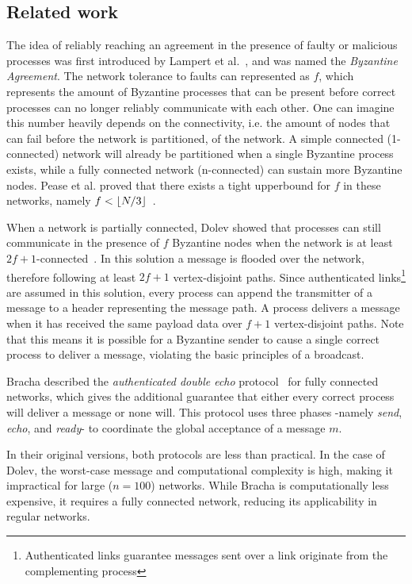 \subsection*{Related work}
The idea of reliably reaching an agreement in the presence of faulty or malicious processes was first introduced by Lampert et al.~\cite{lamport2019byzantine}, and was named the \textit{Byzantine Agreement}. The network tolerance to faults can represented as $f$, which represents the amount of Byzantine processes that can be present before correct processes can no longer reliably communicate with each other. One can imagine this number heavily depends on the connectivity, i.e. the amount of nodes that can fail before the network is partitioned, of the network. A simple connected (1-connected) network will already be partitioned when a single Byzantine process exists, while a fully connected network (n-connected) can sustain more Byzantine nodes. Pease et al. proved that there exists a tight upperbound for $f$ in these networks, namely $f < \lfloor N/3\rfloor$~\cite{pease1980reaching}.

When a network is partially connected, Dolev showed that processes can still communicate in the presence of $f$ Byzantine nodes when the network is at least $2f+1$-connected~\cite{dolev}. In this solution a message is flooded over the network, therefore following at least $2f+1$ vertex-disjoint paths. Since authenticated links\footnote{Authenticated links guarantee messages sent over a link originate from the complementing process} are assumed in this solution, every process can append the transmitter of a message to a header representing the message path. A process delivers a message when it has received the same payload data over $f+1$ vertex-disjoint paths. Note that this means it is possible for a Byzantine sender to cause a single correct process to deliver a message, violating the basic principles of a broadcast.

Bracha described the \textit{authenticated double echo} protocol~\cite{bracha} for fully connected networks, which gives the additional guarantee that either every correct process will deliver a message or none will. This protocol uses three phases -namely \textit{send}, \textit{echo}, and \textit{ready}- to coordinate the global acceptance of a message $m$.

In their original versions, both protocols are less than practical. In the case of Dolev, the worst-case message and computational complexity is high, making it impractical for large ($n=100$) networks. While Bracha is computationally less expensive, it requires a fully connected network, reducing its applicability in regular networks.

